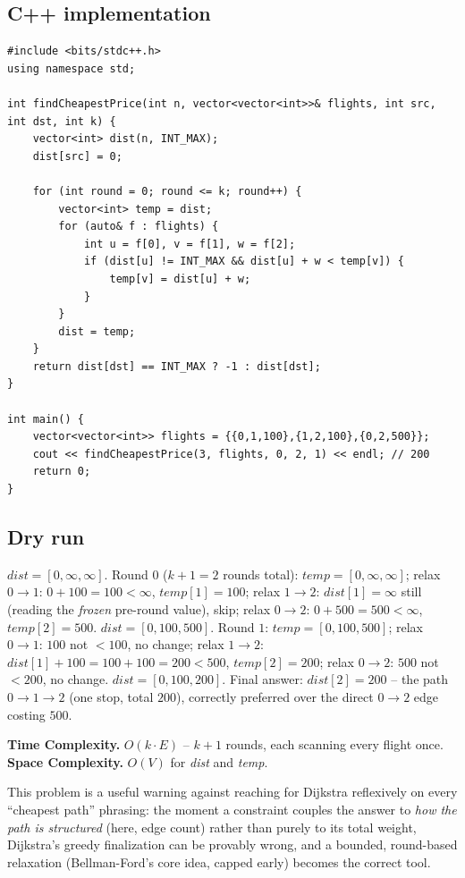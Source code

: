 \subsection*{C++ implementation}

\begin{lstlisting}
#include <bits/stdc++.h>
using namespace std;

int findCheapestPrice(int n, vector<vector<int>>& flights, int src, int dst, int k) {
    vector<int> dist(n, INT_MAX);
    dist[src] = 0;

    for (int round = 0; round <= k; round++) {
        vector<int> temp = dist;
        for (auto& f : flights) {
            int u = f[0], v = f[1], w = f[2];
            if (dist[u] != INT_MAX && dist[u] + w < temp[v]) {
                temp[v] = dist[u] + w;
            }
        }
        dist = temp;
    }
    return dist[dst] == INT_MAX ? -1 : dist[dst];
}

int main() {
    vector<vector<int>> flights = {{0,1,100},{1,2,100},{0,2,500}};
    cout << findCheapestPrice(3, flights, 0, 2, 1) << endl; // 200
    return 0;
}
\end{lstlisting}

\subsection*{Dry run}


$\textit{dist}=[0,\infty,\infty]$. Round $0$ ($k{+}1=2$ rounds total):
$\textit{temp}=[0,\infty,\infty]$; relax $0{\to}1$:
$0+100=100<\infty$, $\textit{temp}[1]=100$; relax $1{\to}2$:
$\textit{dist}[1]=\infty$ still (reading the \emph{frozen} pre-round
value), skip; relax $0{\to}2$: $0+500=500<\infty$,
$\textit{temp}[2]=500$. $\textit{dist}=[0,100,500]$. Round $1$:
$\textit{temp}=[0,100,500]$; relax $0{\to}1$: $100$ not $<100$, no
change; relax $1{\to}2$: $\textit{dist}[1]+100=100+100=200<500$,
$\textit{temp}[2]=200$; relax $0{\to}2$: $500$ not $<200$, no change.
$\textit{dist}=[0,100,200]$. Final answer: $\textit{dist}[2]=200$ --
the path $0{\to}1{\to}2$ (one stop, total $200$), correctly preferred
over the direct $0{\to}2$ edge costing $500$.

\begin{complexitybox}
\textbf{Time Complexity.} $O(k \cdot E)$ -- $k{+}1$ rounds, each
scanning every flight once.
\textbf{Space Complexity.} $O(V)$ for \textit{dist} and \textit{temp}.
\end{complexitybox}

\begin{takeawaybox}
This problem is a useful warning against reaching for Dijkstra
reflexively on every ``cheapest path'' phrasing: the moment a
constraint couples the answer to \emph{how the path is structured}
(here, edge count) rather than purely to its total weight, Dijkstra's
greedy finalization can be provably wrong, and a bounded, round-based
relaxation (Bellman-Ford's core idea, capped early) becomes the correct
tool.
\end{takeawaybox}
